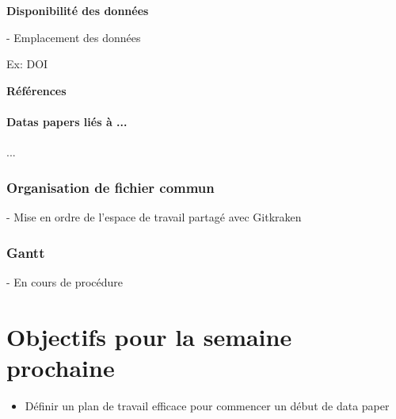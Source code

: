 \documentclass[11pt,oneside]{article}
\begin{document}
\begin{flushleft}
\textbf{Disponibilité des données}
\end{flushleft}

-	Emplacement des données

\begin{flushleft}
Ex: DOI
\end{flushleft}

\begin{flushleft}
\textbf{Références}
\end{flushleft}

\newpage

\subsection*{Datas papers liés à ...}

...

\section*{Organisation de fichier commun}

- Mise en ordre de l'espace de travail partagé avec Gitkraken

\section*{Gantt}

- En cours de procédure

\newpage
\part*{Objectifs pour la semaine prochaine}
\begin{itemize}
	\item Définir un plan de travail efficace pour commencer un début de data paper
	

\end{itemize}
\end{document}
